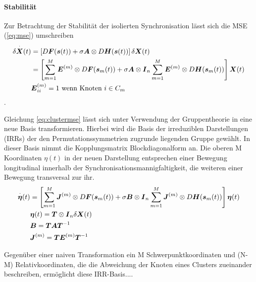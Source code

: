 \paragraph{Stabilität}
Zur Betrachtung der Stabilität der isolierten Synchronisation lässt sich die MSE (\ref{eq:mse}) umschreiben
\begin{align*}
	\label{eq:clustermse}
	\delta\overset{\cdot}{\boldsymbol{X}}(t)&=	
	\left[D\boldsymbol{F}(\boldsymbol{s}(t))+\sigma\boldsymbol{A}\otimes D\boldsymbol{H}(\boldsymbol{s}(t))\right]\delta\boldsymbol{X}(t)\\&=
	\left[\sum_{m=1}^{M} \boldsymbol{E}^{(m)} \otimes D\boldsymbol{F}(\boldsymbol{s}_m(t))+\sigma\boldsymbol{A}\otimes \boldsymbol{I}_n\sum_{m=1}^{M} 			\boldsymbol{E}^{(m)}\otimes D\boldsymbol{H}(\boldsymbol{s}_m(t))\right]\boldsymbol{X}(t)
	\\\notag & \boldsymbol{E}^{(m)}_{ii} =1\text{ wenn Knoten }i \in C_m
	\end{align*}.
	
Gleichung \ref{eq:clustermse} lässt sich unter Verwendung der Gruppentheorie in eine neue Basis transformieren. Hierbei wird die Basis der  irreduziblen Darstellungen (IRRs) der den Permutationssymmetrien  zugrunde liegenden Gruppe gewählt. In dieser Basis nimmt die Kopplungsmatrix Blockdiagonalform an. Die oberen M Koordinaten $\eta(t)$ in der neuen Darstellung entsprechen einer Bewegung longitudinal innerhalb der Synchronisationsmannigfaltigkeit, die weiteren einer Bewegung transversal zur ihr. 
\begin{align}
		\overset{\cdot}{\boldsymbol{\eta}}(t)&=
				\left[\sum_{m=1}^{M} \boldsymbol{J}^{(m)} \otimes D\boldsymbol{F}(\boldsymbol{s}_m(t))+\sigma\boldsymbol{B}\otimes \boldsymbol{I}_n\sum_{m=1}^{M} \boldsymbol{J}^{(m)}\otimes D\boldsymbol{H}(\boldsymbol{s}_m(t))\right]\boldsymbol{\eta}(t)
		\\\notag &\boldsymbol{\eta}(t)=\boldsymbol{T}\otimes\boldsymbol{I}_n\delta\boldsymbol{X}(t)
		\\\notag & \boldsymbol{B}=\boldsymbol{T}\boldsymbol{A}\boldsymbol{T}^{-1}
		\\\notag & \boldsymbol{J}^{(m)}=\boldsymbol{T}\boldsymbol{E}^{(m)}\boldsymbol{T}^{-1}
		\end{align}
		

Gegenüber einer naiven Transformation ein M Schwerpunktkoordinaten und (N-M) Relativkoordinaten, die die Abweichung der Knoten eines Clusters zueinander beschreiben, ermöglicht diese IRR-Basis....




